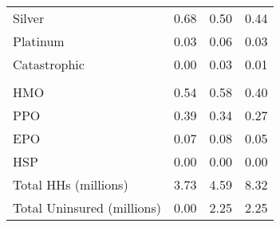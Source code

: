 \begin{tabular}{lrrr}
\hspace{1em}Silver & 0.68 & 0.50 & 0.44\\
\hspace{1em}Platinum & 0.03 & 0.06 & 0.03\\
\hspace{1em}Catastrophic & 0.00 & 0.03 & 0.01\\
\addlinespace[0.3em]
\multicolumn{4}{l}{\textbf{Network Type}}\\
\hspace{1em}HMO & 0.54 & 0.58 & 0.40\\
\hspace{1em}PPO & 0.39 & 0.34 & 0.27\\
\hspace{1em}EPO & 0.07 & 0.08 & 0.05\\
\hspace{1em}HSP & 0.00 & 0.00 & 0.00\\
Total HHs (millions) & 3.73 & 4.59 & 8.32\\
Total Uninsured (millions) & 0.00 & 2.25 & 2.25\\
\bottomrule
\end{tabular}
